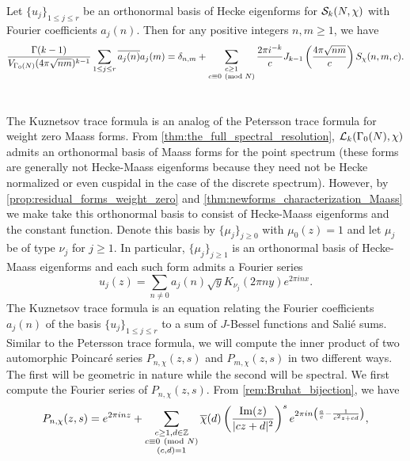     \begin{theorem}
      Let $\{u_{j}\}_{1 \le j \le r}$ be an orthonormal basis of Hecke eigenforms for $\mathcal{S}_{k}(N,\chi)$ with Fourier coefficients $a_{j}(n)$. Then for any positive integers $n,m \ge 1$, we have
      \[
        \frac{\Gamma(k-1)}{V_{\Gamma_{0}(N)}(4\pi\sqrt{nm})^{k-1}}\sum_{1 \le j \le r}\overline{a_{j}(n)}a_{j}(m) = \delta_{n,m}+\sum_{\substack{c \ge 1 \\ c \equiv 0 \ \left(\text{mod }N\right)}}\frac{2\pi i^{-k}}{c}J_{k-1}\left(\frac{4\pi\sqrt{nm}}{c}\right)S_{\chi}(n,m,c).
      \]
    \end{theorem}
  \section{}
    \iffalse
    The Kuznetsov trace formula is an analog of the Petersson trace formula for weight zero Maass forms. From \cref{thm:the_full_spectral_resolution}, $\mathcal{L}_{k}(\Gamma_{0}(N),\chi)$ admits an orthonormal basis of Maass forms for the point spectrum (these forms are generally not Hecke-Maass eigenforms because they need not be Hecke normalized or even cuspidal in the case of the discrete spectrum). However, by \cref{prop:residual_forms_weight_zero} and \cref{thm:newforms_characterization_Maass} we make take this orthonormal basis to consist of Hecke-Maass eigenforms and the constant function. Denote this basis by $\{\mu_{j}\}_{j \ge 0}$ with $\mu_{0}(z) = 1$ and let $\mu_{j}$ be of type $\nu_{j}$ for $j \ge 1$. In particular, $\{\mu_{j}\}_{j \ge 1}$ is an orthonormal basis of Hecke-Maass eigenforms and each such form admits a Fourier series
    \[
      u_{j}(z) = \sum_{n \neq 0}a_{j}(n)\sqrt{y}K_{\nu_{j}}(2\pi ny)e^{2\pi inx}.
    \]
    The Kuznetsov trace formula is an equation relating the Fourier coefficients $a_{j}(n)$ of the basis $\{u_{j}\}_{1 \le j \le r}$ to a sum of $J$-Bessel functions and Sali\'e sums. Similar to the Petersson trace formula, we will compute the inner product of two automorphic Poincar\'e series $P_{n,\chi}(z,s)$ and $P_{m,\chi}(z,s)$ in two different ways. The first will be geometric in nature while the second will be spectral. We first compute the Fourier series of $P_{n,\chi}(z,s)$. From \cref{rem:Bruhat_bijection}, we have
    \[
      P_{n,\chi}(z,s) = e^{2\pi inz}+\sum_{\substack{c \ge 1, d \in \mathbb{Z} \\ c \equiv 0 \ \left(\text{mod }N\right) \\ (c,d) = 1}}\overline{\chi}(d)\left(\frac{\mathrm{Im}(z)}{|cz+d|^{2}}\right)^{s}e^{2\pi in\left(\frac{a}{c}-\frac{1}{c^{2}z+cd}\right)},
    \]
